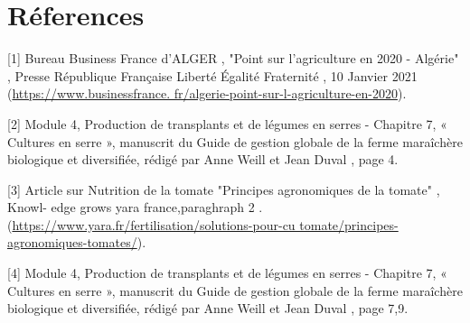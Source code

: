 \chapter*{Réferences} 
\label{chap:reference} 



[1] Bureau Business France d’ALGER , "Point sur l’agriculture en 2020 - Algérie" , Presse
  République Française Liberté Égalité Fraternité , 10 Janvier 2021 (\url{https://www.businessfrance.
  fr/algerie-point-sur-l-agriculture-en-2020}).\newline

[2]    Module 4, Production de transplants et de légumes en serres - Chapitre 7, « Cultures
  en serre », manuscrit du Guide de gestion globale de la ferme maraîchère biologique et
  diversifiée, rédigé par Anne Weill et Jean Duval , page 4.\newline
  
[3] Article sur Nutrition de la tomate "Principes agronomiques de la tomate" , Knowl-
  edge grows yara france,paraghraph 2 . (\url{https://www.yara.fr/fertilisation/solutions-pour-cu
  tomate/principes-agronomiques-tomates/}).\newline

[4] Module 4, Production de transplants et de légumes en serres - Chapitre 7, « Cultures
en serre », manuscrit du Guide de gestion globale de la ferme maraîchère biologique et
diversifiée, rédigé par Anne Weill et Jean Duval , page 7,9.  